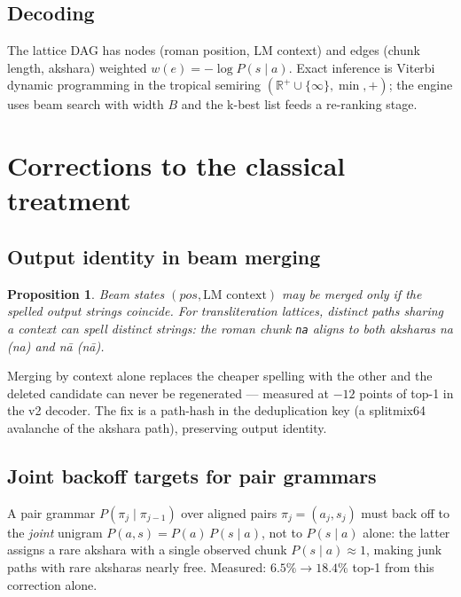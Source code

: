 \documentclass[11pt,a4paper]{article}
\newtheorem{proposition}{Proposition}
\newcommand{\nda}{\emph{na}}
\newcommand{\naa}{\emph{n\=a}}
\begin{document}
\subsection{Decoding}

The lattice DAG has nodes (roman position, LM context) and edges
(chunk length, akshara) weighted $w(e) = -\log P(s \mid a)$. Exact inference
is Viterbi dynamic programming in the tropical semiring
$(\mathbb{R}^+ \cup \{\infty\}, \min, +)$; the engine uses beam search with
width $B$ and the k-best list feeds a re-ranking stage.

\section{Corrections to the classical treatment}

\subsection{Output identity in beam merging}
\begin{proposition}\label{prop:merge}
Beam states $(pos, \text{LM context})$ may be merged only if the spelled
output strings coincide. For transliteration lattices, distinct paths
sharing a context can spell distinct strings: the roman chunk \texttt{na}
aligns to both aksharas \nda{} (na) and \naa{} (n\=a).
\end{proposition}
Merging by context alone replaces the cheaper spelling with the other and
the deleted candidate can never be regenerated --- measured at $-12$ points
of top-1 in the v2 decoder. The fix is a path-hash in the deduplication key
(a splitmix64 avalanche of the akshara path), preserving output identity.

\subsection{Joint backoff targets for pair grammars}\label{sec:joint}
A pair grammar $P(\pi_j \mid \pi_{j-1})$ over aligned pairs
$\pi_j = (a_j, s_j)$ must back off to the \emph{joint} unigram
$P(a,s) = P(a)\,P(s \mid a)$, not to $P(s \mid a)$ alone: the latter assigns
a rare akshara with a single observed chunk $P(s\mid a) \approx 1$, making
junk paths with rare aksharas nearly free. Measured: $6.5\% \to 18.4\%$
top-1 from this correction alone.
\end{document}
